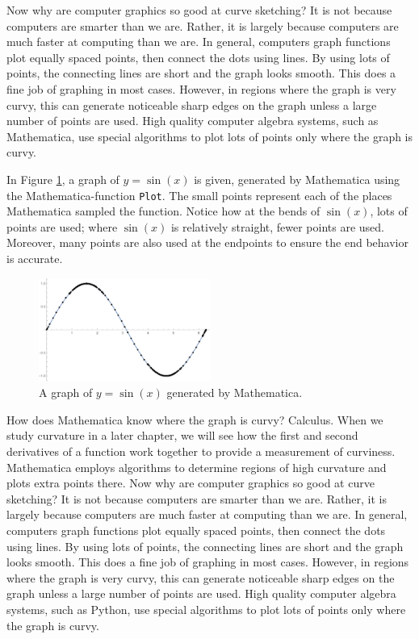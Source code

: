\ifmathematica
Now why are computer graphics so good at curve sketching? It is not because computers are smarter than we are. Rather, it is largely because computers are much faster at computing than we are. In general, computers graph functions plot equally spaced points, then connect the dots using lines. By using lots of points, the connecting lines are short and the graph looks smooth. This does a fine job of graphing in most cases. However, in regions where the graph is very curvy, this can generate noticeable sharp edges on the graph unless a large number of points are used. High quality computer algebra systems, such as Mathematica, use special algorithms to plot lots of points only where the graph is curvy.

In Figure \ref{fig_behaviour_28}, a graph of $y=\sin(x)$ is given, generated by Mathematica using the Mathematica-function \lstinline{Plot}. The small points represent each of the places Mathematica sampled the function. Notice how at the bends of $\sin (x)$, lots of points are used; where $\sin(x)$ is relatively straight, fewer points are used. Moreover, many points are also used at the endpoints to ensure the end behavior is accurate. 

\begin{figure}
	\begin{center}
			\includegraphics[width=0.5\textwidth]{fig_behaviour_28}
	\caption{A graph of $y=\sin(x)$ generated by Mathematica.}
	\label{fig_behaviour_28}
	\end{center}
\end{figure}

How does Mathematica know where the graph is curvy? Calculus. When we study curvature in a later chapter, we will see how the first and second derivatives of a function work together to provide a measurement of curviness. Mathematica employs algorithms to determine regions of high curvature and plots extra points there.
\fi
\ifpython
Now why are computer graphics so good at curve sketching? It is not because computers are smarter than we are. Rather, it is largely because computers are much faster at computing than we are. In general, computers graph functions plot equally spaced points, then connect the dots using lines. By using lots of points, the connecting lines are short and the graph looks smooth. This does a fine job of graphing in most cases. However, in regions where the graph is very curvy, this can generate noticeable sharp edges on the graph unless a large number of points are used. High quality computer algebra systems, such as Python, use special algorithms to plot lots of points only where the graph is curvy.

